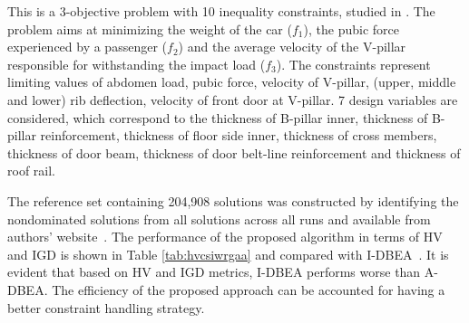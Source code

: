 This is a 3-objective problem with 10 inequality constraints, studied in \cite{Deb2014adaptive}. The problem aims at minimizing the weight of the car ($f_1$), the pubic force experienced by a passenger ($f_2$) and the average velocity of the V-pillar responsible for withstanding the impact load ($f_3$). The constraints represent limiting values of abdomen load, pubic force, velocity of V-pillar, (upper, middle and lower) rib deflection, velocity of front door at V-pillar. 7 design variables are considered, which correspond to the thickness of B-pillar inner, thickness of B-pillar reinforcement, thickness of floor side inner, thickness of cross members, thickness of door beam, thickness of door belt-line reinforcement and thickness of roof rail. 

The reference set containing 204,908 solutions was constructed by identifying the nondominated solutions from all solutions across all runs and available from authors' website~\cite{mdo2017adbea}. The performance of the proposed algorithm in terms of HV and IGD is shown in Table \ref{tab:hvcsiwrgaa} and compared with I-DBEA~\cite{Asafmany2015}. It is evident that based on HV and IGD metrics, I-DBEA performs worse than A-DBEA. The efficiency of the proposed approach can be accounted for having a better constraint handling strategy.	


